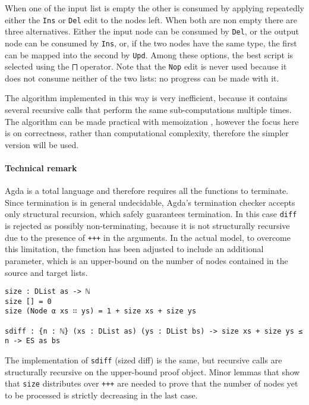 \documentclass[../Thesis.tex]{subfiles}
\begin{document}
	When one of the input list is empty the other is consumed 
	by applying repeatedly either the \texttt{Ins} or \texttt{Del} edit
	to the nodes left. When both are non empty there are three
	alternatives. Either the input node can be consumed by \texttt{Del},
	or the output node can be consumed by \texttt{Ins}, or, if
	the two nodes have the same type, the first can be mapped into
	the second by \texttt{Upd}. Among these options, the best 
	script is selected using the \texttt{⨅} operator.
	Note that the \texttt{Nop} edit is never used because it does
	not consume neither of the two lists: no progress can be made with it.

	The algorithm implemented in this way is very inefficient,
	because it contains several recursive calls that perform the same 
	sub-computations multiple times. 
	The algorithm can be made practical with memoization \cite{Lemp09},
	however the focus here is on correctness, rather than computational 
	complexity, 	therefore the simpler version will be used.
	
	\paragraph{Technical remark}
	Agda is a total language and therefore requires all the functions to 
	terminate. Since termination is in general undecidable, Agda's termination 
	checker accepts only structural recursion, which safely guarantees
	termination. In this case \texttt{diff} is rejected as possibly 
	non-terminating, because it is not structurally recursive
	due to the presence of \texttt{+++} in the arguments. 
	In the actual model, to overcome this limitation, the function has been 
	adjusted to include an additional parameter, which is an upper-bound 
	on the number of nodes contained in the source and target lists.
	
\begin{verbatim}
size : DList as -> ℕ 
size [] = 0
size (Node α xs ∷ ys) = 1 + size xs + size ys

sdiff : {n : ℕ} (xs : DList as) (ys : DList bs) -> size xs + size ys ≤ n -> ES as bs
\end{verbatim}
	
	The implementation of \texttt{sdiff} (sized diff) is the same, but recursive 
	calls	are structurally recursive on the upper-bound proof object.
	Minor lemmas that show that \texttt{size} distributes over \texttt{+++}
	are needed to prove that the number of nodes yet to be processed
	is strictly decreasing in the last case.
\end{document}
